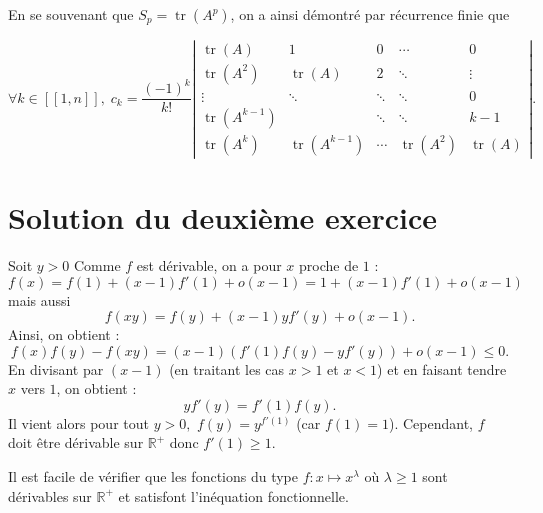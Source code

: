 \begin{enumerate}
 
En se souvenant que \( S_p = \operatorname{tr}\left(A^{p}\right) \), on a ainsi démontré par récurrence finie que 
 
\[ \forall k \in[\![1,n]\!], \; c_{k}=\frac{(-1)^{k}}{k !}\left|\begin{array}{ccccc}
{\operatorname{tr}(A)} & {1} & {0} & {\cdots} & {0} \\
{\operatorname{tr}\left(A^{2}\right)} & {\operatorname{tr}(A)} & {2} & {\ddots} & {\vdots} \\
{\vdots} & {\ddots} & {\ddots} & {\ddots} & {0} \\
{\operatorname{tr}\left(A^{k-1}\right)} & {} & {\ddots} & {\ddots} & {k-1} \\
{\operatorname{tr}\left(A^{k}\right)} & {\operatorname{tr}\left(A^{k-1}\right)} & {\cdots} & {\operatorname{tr}\left(A^{2}\right)} & {\operatorname{tr}(A)}
\end{array}\right|. \]
 
\end{enumerate}


\section{Solution du deuxième exercice} %

Soit $y>0$
Comme $f$ est dérivable, on a pour $x$ proche de $1$ : 
$$f(x)=f(1)+(x-1)f'(1)+o(x-1)=1+(x-1)f'(1)+o(x-1)$$ mais aussi $$ f(xy)=f(y)+(x-1)yf'(y)+o(x-1).$$
Ainsi, on obtient : $$f(x)f(y)-f(xy)=(x-1)\left( f'(1)f(y)-yf'(y) \right)+o(x-1)\leq 0.$$
En divisant par $(x-1)$ (en traitant les cas $x>1$ et $x<1$) et en faisant tendre $x$ vers $1$, on obtient : $$yf'(y)=f'(1)f(y).$$
Il vient alors pour tout $y>0,$ $\displaystyle f(y)=y^{f'(1)}$ (car $f(1)=1$).
Cependant, $f$ doit être dérivable sur $\mathbb{R}^{+}$ donc $f'(1)\geq 1.$

Il est facile de vérifier que les fonctions du type $ f: x\mapsto x^{\lambda}$ où $\lambda\geq 1$ sont dérivables sur $\mathbb{R}^{+}$ et satisfont l'inéquation fonctionnelle.